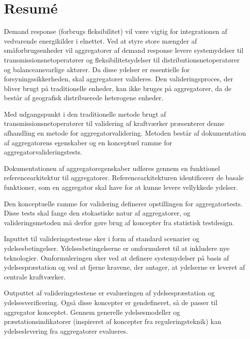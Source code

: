 \chapter{Resum\'e}
Demand response (forbrugs fleksibilitet) vil være vigtig for integrationen af vedvarende energikilder i elnettet. Ved at styre store mængder af småforbrugsenheder vil aggregatorer af demand response levere systemydelser til transmissionsnetoperatører og fleksibilitetsydelser til distributionsnetoperatører og balanceansvarlige aktører. Da disse ydelser er essentielle for forsyningssikkerheden, skal aggregatorer valideres. Den valideringsproces, der bliver brugt på traditionelle enheder, kan ikke bruges på aggregatorer, da de består af geografisk distribuerede heterogene enheder.

 Med udgangspunkt i den traditionelle metode brugt af transmissionsnetoperatører til validering af kraftværker præsenterer denne afhandling en metode for aggregatorvalidering. Metoden består af dokumentation af aggregatorens egenskaber og en konceptuel ramme for aggregatorvalideringstests.
 
Dokumentationen af aggregatoregenskaber udføres gennem en funktionel referencearkitektur til aggregatorer. Referencearkitekturen identificerer de basale funktioner, som en aggregator skal have for at kunne levere vellykkede ydelser. 
 
Den konceptuelle ramme for validering definerer opstillingen for aggregatortests. Disse tests skal fange den stokastiske natur af aggregatorer, og valideringsmetoden må derfor gøre brug af koncepter fra statistisk testdesign.
 
Inputtet til valideringstestene sker i form af standard scenarier og ydelsesbetingelser. Ydelsesbetingelserne er omformuleret til at inkludere nye teknologier. Omformuleringen sker ved at definere systemydelser på basis af ydelsespræstation og ved at fjerne kravene, der antager, at ydelserne er leveret af centrale kraftværker.
 
Outputtet af valideringstestene er evalueringen af ydelsespræstation og ydelsesverificering. Også disse koncepter er gendefineret, så de passer til aggregator konceptet. Gennem generelle ydelsesmodeller og præstationsindikatorer (inspireret af koncepter fra reguleringsteknik) kan ydelseslevering fra aggregatorer evalueres.

